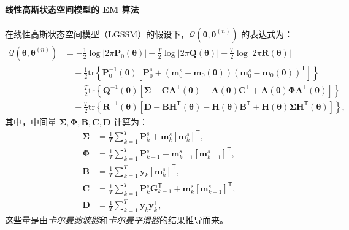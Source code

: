 \paragraph*{线性高斯状态空间模型的 EM 算法}
在线性高斯状态空间模型（LGSSM）的假设下，\(\mathcal{Q}(\boldsymbol{\theta}, \boldsymbol{\theta}^{(n)})\) 的表达式为：
\begin{align}
    \mathcal{Q}(\boldsymbol{\theta}, \boldsymbol{\theta}^{(n)}) &= -\frac{1}{2} \log |2\pi \mathbf{P}_0(\boldsymbol{\theta})| - \frac{T}{2} \log |2\pi \mathbf{Q}(\boldsymbol{\theta})| - \frac{T}{2} \log |2\pi \mathbf{R}(\boldsymbol{\theta})| \nonumber \\
    &\quad - \frac{1}{2} \mathrm{tr} \left\{ \mathbf{P}_0^{-1}(\boldsymbol{\theta}) \left[ \mathbf{P}_0^s + (\mathbf{m}_0^s - \mathbf{m}_0(\boldsymbol{\theta}))(\mathbf{m}_0^s - \mathbf{m}_0(\boldsymbol{\theta}))^\mathsf{T} \right] \right\} \nonumber \\
    &\quad - \frac{T}{2} \mathrm{tr} \left\{ \mathbf{Q}^{-1}(\boldsymbol{\theta}) \left[ \boldsymbol{\Sigma} - \mathbf{C} \mathbf{A}^\mathsf{T}(\boldsymbol{\theta}) - \mathbf{A}(\boldsymbol{\theta}) \mathbf{C}^\mathsf{T} + \mathbf{A}(\boldsymbol{\theta}) \boldsymbol{\Phi} \mathbf{A}^\mathsf{T}(\boldsymbol{\theta}) \right] \right\} \nonumber \\
    &\quad - \frac{T}{2} \mathrm{tr} \left\{ \mathbf{R}^{-1}(\boldsymbol{\theta}) \left[ \mathbf{D} - \mathbf{B} \mathbf{H}^\mathsf{T}(\boldsymbol{\theta}) - \mathbf{H}(\boldsymbol{\theta}) \mathbf{B}^\mathsf{T} + \mathbf{H}(\boldsymbol{\theta}) \boldsymbol{\Sigma} \mathbf{H}^\mathsf{T}(\boldsymbol{\theta}) \right] \right\}, \label{eq: Q for LGSSM}
\end{align}
其中，中间量 \(\boldsymbol{\Sigma}, \boldsymbol{\Phi}, \mathbf{B}, \mathbf{C}, \mathbf{D}\) 计算为：
\begin{align}
    \boldsymbol{\Sigma} &= \frac{1}{T} \sum_{k=1}^{T} \mathbf{P}_k^s + \mathbf{m}_k^s [\mathbf{m}_k^s]^\mathsf{T}, \label{eq: middle Sigma} \\
    \boldsymbol{\Phi} &= \frac{1}{T} \sum_{k=1}^{T} \mathbf{P}_{k-1}^s + \mathbf{m}_{k-1}^s [\mathbf{m}_{k-1}^s]^\mathsf{T}, \label{eq: middle Phi} \\
    \mathbf{B} &= \frac{1}{T} \sum_{k=1}^{T} \mathbf{y}_k [\mathbf{m}_k^s]^\mathsf{T}, \label{eq: middle B} \\
    \mathbf{C} &= \frac{1}{T} \sum_{k=1}^{T} \mathbf{P}_k^s \mathbf{G}_{k-1}^\mathsf{T} + \mathbf{m}_k^s [\mathbf{m}_{k-1}^s]^\mathsf{T}, \label{eq: middle C} \\
    \mathbf{D} &= \frac{1}{T} \sum_{k=1}^{T} \mathbf{y}_k \mathbf{y}_k^\mathsf{T}, \label{eq: middle D}
\end{align}
这些量是由\textit{卡尔曼滤波器}和\textit{卡尔曼平滑器}的结果推导而来。

